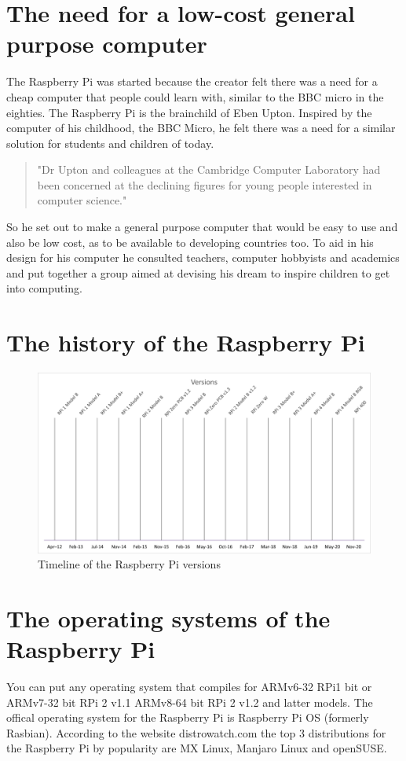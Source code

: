 \documentclass{article}
\begin{document}
    \section{The need for a low-cost general purpose computer}
    The Raspberry Pi was started because the creator felt there was a need for a cheap computer that people could learn with, similar to the BBC micro in the eighties. 
    The Raspberry Pi is the brainchild of Eben Upton. Inspired by the computer of his childhood, the BBC Micro, he felt there was a need for a similar solution for students 
    and children of today.
    \begin{quotation}
     "Dr Upton and colleagues at the Cambridge Computer Laboratory had been concerned at the declining figures for young people interested in computer science."
    \end{quotation} 
    So he set out to make a general purpose computer that would be easy to use and also be low cost, as to be available to developing countries too. To aid in his design for his computer he consulted teachers, computer hobbyists and academics and put together a group aimed at devising his dream to inspire children to get into computing.

    \section{The history of the Raspberry Pi}
    \begin{figure}[ht]
        \centering
        \includegraphics[scale=0.4]{versions.png}
        \caption{Timeline of the Raspberry Pi versions}
        \label{fig:rpiver}
    \end{figure}

    \newpage


    \section{The operating systems of the Raspberry Pi}
    You can put any operating system that compiles for ARMv6-32 RPi1 bit or ARMv7-32 bit RPi 2 v1.1 ARMv8-64 bit RPi 2 v1.2 and latter models. The offical operating system for the 
    Raspberry Pi is Raspberry Pi OS (formerly Rasbian). According to the website distrowatch.com the top 3 distributions for the Raspberry Pi by popularity are MX Linux, Manjaro Linux 
    and openSUSE.
\end{document}
